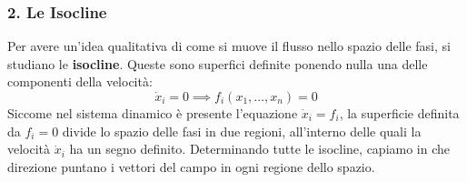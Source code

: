 \documentclass[openany]{book}
\theoremstyle{definition}
\theoremstyle{remark}
\begin{document}
\subsubsection*{2. Le Isocline}
Per avere un'idea qualitativa di come si muove il flusso nello spazio delle fasi, si studiano le \textbf{isocline}. Queste sono superfici definite ponendo nulla una delle componenti della velocità:
\begin{equation}
    \dot{x}_i = 0 \implies f_i(x_1, \dots, x_n) = 0
\end{equation}
Siccome nel sistema dinamico è presente l'equazione $\dot{x}_i = f_i$, la superficie definita da $f_i = 0$ divide lo spazio delle fasi in due regioni, all'interno delle quali la velocità $\dot{x}_i$ ha un segno definito. Determinando tutte le isocline, capiamo in che direzione puntano i vettori del campo in ogni regione dello spazio.

\vspace{0.5cm}
\begin{center}
\end{center}
\vspace{0.5cm}
\end{document}

